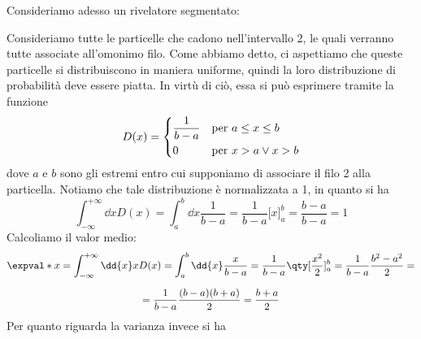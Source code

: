 Consideriamo adesso un rivelatore segmentato:
\begin{figure}[H]
   \centering
\end{figure}
Consideriamo tutte le particelle che cadono nell'intervallo 2, le quali verranno tutte associate all'omonimo filo. Come abbiamo detto, ci aspettiamo che queste particelle si distribuiscono in maniera uniforme, quindi la loro distribuzione di probabilità deve essere piatta. In virtù di ciò, essa si può esprimere tramite la funzione
\begin{equation*}
   D(x)=
   \begin{dcases}
      \frac{1}{b-a} & \text{per } a \leq x \leq b\\
      0 & \text{per } x>a \vee x>b\\
   \end{dcases}
\end{equation*}
dove $a$ e $b$ sono gli estremi entro cui supponiamo di associare il filo 2 alla particella. Notiamo che tale distribuzione è normalizzata a 1, in quanto si ha
\begin{equation*}
   \int_{-\infty}^{+\infty} \dd{x} D(x)
   =\int_{a}^{b} \dd{x} \frac{1}{b-a}
   =\frac{1}{b-a} \bigl[ x \bigr]_{a}^{b}
   =\frac{b-a}{b-a}
   =1
\end{equation*}
Calcoliamo il valor medio:
\begin{gather*}
   \expval*{x}
   =\int_{-\infty}^{+\infty} \dd{x} x D(x)
   =\int_{a}^{b} \dd{x} \frac{x}{b-a}
   =\frac{1}{b-a} \qty[ \frac{x^2}{2} ]_{a}^{b}
   =\frac{1}{b-a} \frac{b^2 - a^2}{2}=
   \\[0.2cm]
   =\frac{1}{b-a} \frac{(b - a)(b + a)}{2}
   =\frac{b + a}{2}
\end{gather*}
Per quanto riguarda la varianza invece si ha

